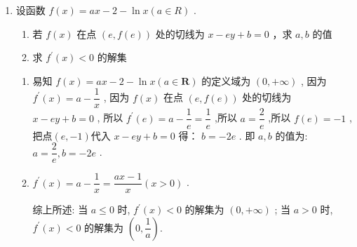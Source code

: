 \begin{enumerate}
    \item 设函数 $f\left( x\right)  = {ax} - 2 - \ln x\left( {a \in  {R}}\right)$ .
    \begin{enumerate}
        \item 若 $f\left( x\right)$ 在点 $\left( {{e},f\left( {e}\right) }\right)$ 处的切线为 $x - {e}y + b = 0$ ，求 $a,b$ 的值
        \item 求 ${f}^{\prime }\left( x\right)  < 0$ 的解集
    \end{enumerate}
    \begin{jieda}
        \begin{enumerate}
            \item 易知 $f\left( x\right)  = {ax} - 2 - \ln x\left( {a \in  \mathbf{R}}\right)$ 的定义域为 $\left( {0, + \infty }\right)$ ,
            因为 ${f}^{\prime }\left( x\right)  = a - \dfrac{1}{x}$ ,
            因为 $f\left( x\right)$ 在点 $\left( {{e},f\left( {e}\right) }\right)$ 处的切线为 $x - {e}y + b = 0$ ,
            所以 ${f}^{\prime }\left( {e}\right)  = a - \dfrac{1}{{e}} = \dfrac{1}{{e}}$ ,所以 $a = \dfrac{2}{{e}}$ ,所以 $f\left( {e}\right)  =  - 1$ ,
            把点$(e, -1)$代入 $x - {e}y + b = 0$ 得： $b =  - 2{e}$ .
            即 $a,b$ 的值为: $a = \dfrac{2}{{e}},b =  - 2{e}$ .
            \item ${f}^{\prime }\left( x\right)  = a - \dfrac{1}{x} = \dfrac{{ax} - 1}{x}\left( {x > 0}\right)$ .
            
            综上所述: 当 $a \leq  0$ 时, ${f}^{\prime }\left( x\right)  < 0$ 的解集为 $\left( {0, + \infty }\right)$ ;
            当 $a > 0$ 时, ${f}^{\prime }\left( x\right)  < 0$ 的解集为 $\left( {0,\dfrac{1}{a}}\right)$.
        \end{enumerate}
    \end{jieda}
\end{enumerate}
\clearpage
